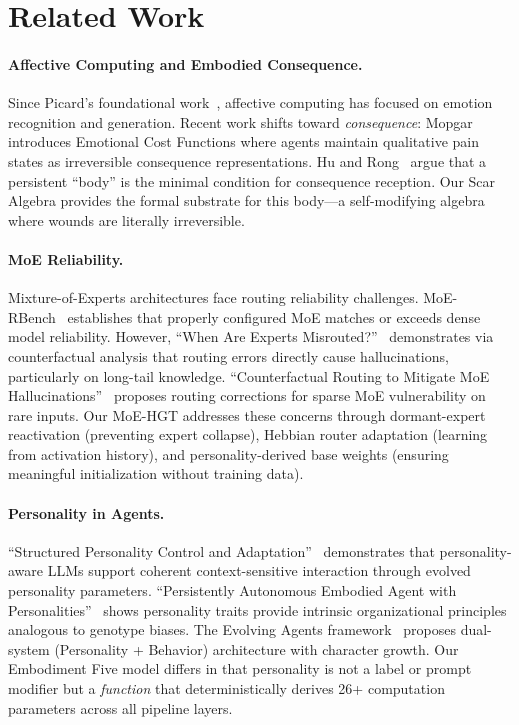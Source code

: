 \documentclass[11pt]{article}
\begin{document}
\section{Related Work}
\label{sec:related}

\paragraph{Affective Computing and Embodied Consequence.}
Since Picard's foundational work~\cite{picard1997}, affective computing has focused on emotion recognition and generation. Recent work shifts toward \emph{consequence}: Mopgar~\cite{mopgar2026} introduces Emotional Cost Functions where agents maintain qualitative pain states as irreversible consequence representations. Hu and Rong~\cite{hu2026} argue that a persistent ``body'' is the minimal condition for consequence reception. Our Scar Algebra provides the formal substrate for this body---a self-modifying algebra where wounds are literally irreversible.

\paragraph{MoE Reliability.}
Mixture-of-Experts architectures face routing reliability challenges. MoE-RBench~\cite{moerbench2024} establishes that properly configured MoE matches or exceeds dense model reliability. However, ``When Are Experts Misrouted?''~\cite{misrouted2025} demonstrates via counterfactual analysis that routing errors directly cause hallucinations, particularly on long-tail knowledge. ``Counterfactual Routing to Mitigate MoE Hallucinations''~\cite{counterfactual2025} proposes routing corrections for sparse MoE vulnerability on rare inputs. Our MoE-HGT addresses these concerns through dormant-expert reactivation (preventing expert collapse), Hebbian router adaptation (learning from activation history), and personality-derived base weights (ensuring meaningful initialization without training data).

\paragraph{Personality in Agents.}
``Structured Personality Control and Adaptation''~\cite{structured2025} demonstrates that personality-aware LLMs support coherent context-sensitive interaction through evolved personality parameters. ``Persistently Autonomous Embodied Agent with Personalities''~\cite{persistent2026} shows personality traits provide intrinsic organizational principles analogous to genotype biases. The Evolving Agents framework~\cite{evolving2024} proposes dual-system (Personality + Behavior) architecture with character growth. Our Embodiment Five model differs in that personality is not a label or prompt modifier but a \emph{function} that deterministically derives 26+ computation parameters across all pipeline layers.
\end{document}
